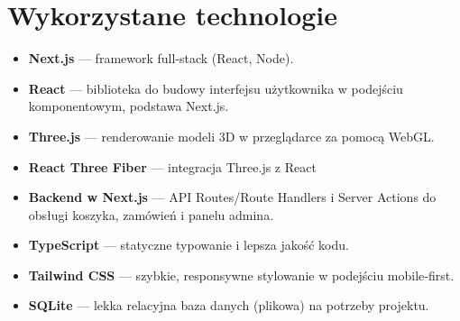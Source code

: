 \documentclass[14pt]{extarticle}
\begin{document}
	\section{Wykorzystane technologie}
		\begin{itemize}
			\item \textbf{Next.js} — framework full‑stack (React, Node).
			\item \textbf{React} — biblioteka do budowy interfejsu użytkownika w podejściu komponentowym, podstawa Next.js.
			\item \textbf{Three.js} — renderowanie modeli 3D w przeglądarce za pomocą WebGL.
			\item \textbf{React Three Fiber} — integracja Three.js z React
			\item \textbf{Backend w Next.js} — API Routes/Route Handlers i Server Actions do obsługi koszyka, zamówień i panelu admina.
			\item \textbf{TypeScript} — statyczne typowanie i lepsza jakość kodu.
			\item \textbf{Tailwind CSS} — szybkie, responsywne stylowanie w podejściu mobile‑first.
			\item \textbf{SQLite} — lekka relacyjna baza danych (plikowa) na potrzeby projektu.
		\end{itemize}
		
	
\end{document}
